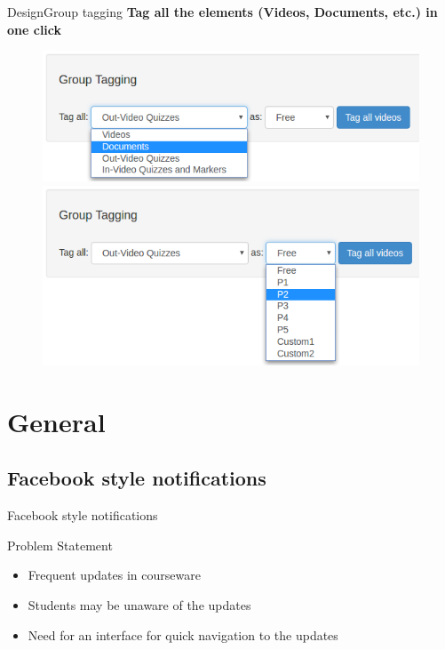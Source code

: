 \documentclass[xcolor=table]{beamer}
\begin{document}
\begin{frame}{Design}{Group tagging}
\textbf{Tag all the elements (Videos, Documents, etc.) in one click}
	\begin{figure}
	\centering
	\includegraphics[width=0.6\linewidth]{media/gt1} \\
	\includegraphics[width=0.6\linewidth]{media/gt2}
	\label{fig:gt}
	\end{figure}
\end{frame}

\section{General}

\subsection{Facebook style notifications}

\begin{frame}{Facebook style notifications}
	\begin{block}{Problem Statement}
	\begin{itemize}
		\item Frequent updates in courseware
		\item Students may be unaware of the updates
		\item Need for an interface for quick navigation to the updates
	\end{itemize}
	\end{block}
\end{frame}
\end{document}
